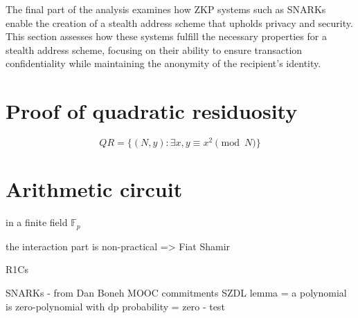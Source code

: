 The final part of the analysis examines how ZKP systems such as SNARKs enable
the creation of a stealth address scheme that upholds privacy and security.
This section assesses how these systems fulfill the necessary properties for a
stealth address scheme, focusing on their ability to ensure transaction
confidentiality while maintaining the anonymity of the recipient's identity.

\section{Proof of quadratic residuosity}
\[QR = \lbrace(N, y): \exists x, y \equiv x^2 \pmod{N}\rbrace\]

\section{Arithmetic circuit}
in a finite field $\mathbb{F}_p$




the interaction part is non-practical => Fiat Shamir

R1Cs

SNARKs - from Dan Boneh MOOC
commitments
SZDL lemma = a polynomial is zero-polynomial with d\/p probability = zero - test
